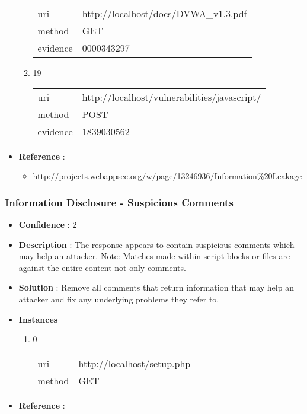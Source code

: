 \documentclass[10pt]{article}
\begin{document}
\begin{itemize}
\begin{enumerate}
\begin{tabular}{| l | p{12cm}}
uri & http://localhost/docs/DVWA\_v1.3.pdf \\
method & GET \\
evidence & 0000343297 \\
\end{tabular}
\item[] 19
\begin{tabular}{| l | p{12cm}}
uri & http://localhost/vulnerabilities/javascript/ \\
method & POST \\
evidence & 1839030562 \\
\end{tabular}
\end{enumerate}
\item[] \textbf{Reference} : 
\begin{itemize}
\item \url{http://projects.webappsec.org/w/page/13246936/Information\%20Leakage}
\end{itemize}
\end{itemize}
\subsubsection{Information Disclosure - Suspicious Comments}
\begin{itemize}
\item[] \textbf{Confidence} : 2
\item[] \textbf{Description} : The response appears to contain suspicious comments which may help an attacker. Note: Matches made within script blocks or files are against the entire content not only comments.
\item[] \textbf{Solution} :  Remove all comments that return information that may help an attacker and fix any underlying problems they refer to.
\item[] \textbf{Instances}
\begin{enumerate}
\item[] 0
\begin{tabular}{| l | p{12cm}}
uri & http://localhost/setup.php \\
method & GET \\
\end{tabular}
\end{enumerate}
\item[] \textbf{Reference} : 
\end{itemize}
\end{document}

